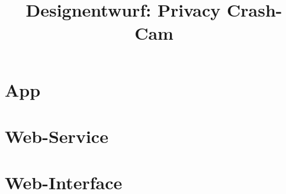 \documentclass[a4paper,twoside,BCOR=20mm]{scrreprt}
\title{Designentwurf: Privacy Crash- Cam}
\begin{document}

\tableofcontents
\newpage



\label{chap:app}\chapter{App}


\newpage

\newpage


\label{chap:service}\chapter{Web-Service}






\label{chap:interface}\chapter{Web-Interface}






\end{document}

